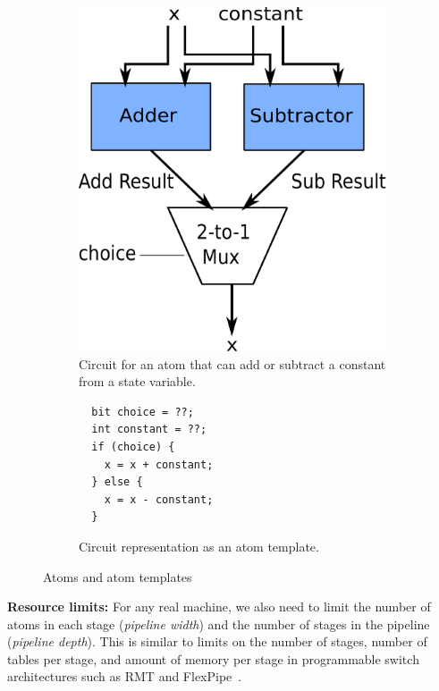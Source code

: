 \begin{figure}[h]
  \begin{subfigure}{0.4\columnwidth}
  \begin{center}
  \includegraphics[width=\columnwidth]{circuit.pdf}
  \end{center}
  \caption{Circuit for an atom that can add or subtract a constant from a state variable.}
  \label{fig:alu_diag}
  \end{subfigure}
  \hspace{0.05\columnwidth}
  \begin{subfigure}{0.55\columnwidth}
  \begin{lstlisting}
  bit choice = ??;
  int constant = ??;
  if (choice) {
    x = x + constant;
  } else {
    x = x - constant;
  }
  \end{lstlisting}
  \caption{Circuit representation as an atom template.}
  \label{fig:alu_in_sketch}
  \end{subfigure}
  \caption{Atoms and atom templates}
  \label{fig:atom}
\end{figure}

\textbf{Resource limits:} For any real machine, we also need to limit the
number of atoms in each stage (\textit{pipeline width}) and the number of
stages in the pipeline (\textit{pipeline depth}). This is similar to limits on
the number of stages, number of tables per stage, and amount of memory per
stage in programmable switch architectures such as RMT and
FlexPipe~\cite{lavanya_compiler}.

